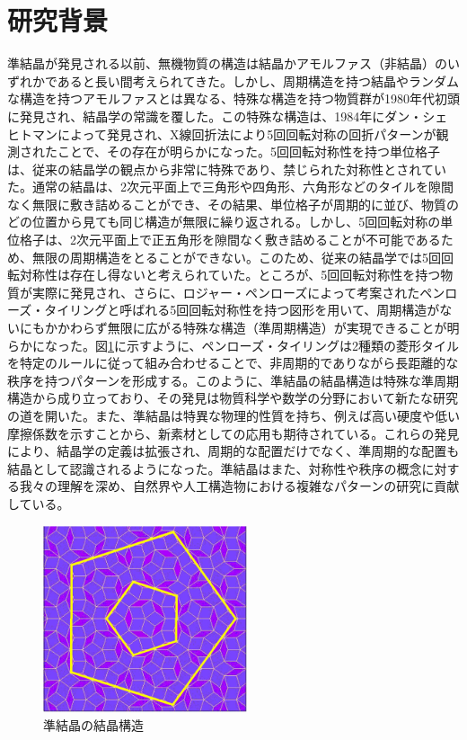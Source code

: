 \documentclass[11pt,a4j]{jreport}
\begin{document}
\section{研究背景} %
準結晶が発見される以前、無機物質の構造は結晶かアモルファス（非結晶）のいずれかであると長い間考えられてきた。しかし、周期構造を持つ結晶やランダムな構造を持つアモルファスとは異なる、特殊な構造を持つ物質群が1980年代初頭に発見され、結晶学の常識を覆した。この特殊な構造は、1984年にダン・シェヒトマンによって発見され、X線回折法により5回回転対称の回折パターンが観測されたことで、その存在が明らかになった。5回回転対称性を持つ単位格子は、従来の結晶学の観点から非常に特殊であり、禁じられた対称性とされていた。通常の結晶は、2次元平面上で三角形や四角形、六角形などのタイルを隙間なく無限に敷き詰めることができ、その結果、単位格子が周期的に並び、物質のどの位置から見ても同じ構造が無限に繰り返される。しかし、5回回転対称の単位格子は、2次元平面上で正五角形を隙間なく敷き詰めることが不可能であるため、無限の周期構造をとることができない。このため、従来の結晶学では5回回転対称性は存在し得ないと考えられていた。ところが、5回回転対称性を持つ物質が実際に発見され、さらに、ロジャー・ペンローズによって考案されたペンローズ・タイリングと呼ばれる5回回転対称性を持つ図形を用いて、周期構造がないにもかかわらず無限に広がる特殊な構造（準周期構造）が実現できることが明らかになった。図\ref{quasicrystalline_structure1}に示すように、ペンローズ・タイリングは2種類の菱形タイルを特定のルールに従って組み合わせることで、非周期的でありながら長距離的な秩序を持つパターンを形成する。このように、準結晶の結晶構造は特殊な準周期構造から成り立っており、その発見は物質科学や数学の分野において新たな研究の道を開いた。また、準結晶は特異な物理的性質を持ち、例えば高い硬度や低い摩擦係数を示すことから、新素材としての応用も期待されている。これらの発見により、結晶学の定義は拡張され、周期的な配置だけでなく、準周期的な配置も結晶として認識されるようになった。準結晶はまた、対称性や秩序の概念に対する我々の理解を深め、自然界や人工構造物における複雑なパターンの研究に貢献している。
\begin{figure}[htbp]
  \centering
  \vspace{4mm}
  \includegraphics[width=60mm]{./figure/quasicrystalline_structure1.jpg}
  \caption{準結晶の結晶構造}
  \label{quasicrystalline_structure1}
\end{figure}
\end{document}
